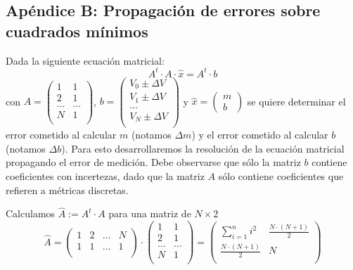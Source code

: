 \subsection{Apéndice B: Propagación de errores sobre cuadrados mínimos}
Dada la siguiente ecuación matricial:
$$ A^t \cdot A \cdot \hat{x} = A^t \cdot b $$
con
$
A = \begin{pmatrix} 
1 & 1 \\
2 & 1 \\
\dots & \dots \\
N & 1 \\
\end{pmatrix}
$, $
b = \begin{pmatrix}
V_0 \pm \Delta V\\
V_1 \pm \Delta V\\
\dots \\
V_N \pm \Delta V\\
\end{pmatrix}
$ y $
\hat{x} = \begin{pmatrix}
m \\
b
\end{pmatrix}
$ se quiere determinar el error cometido al calcular $m$ (notamos $\Delta m$) y el error cometido al calcular $b$ (notamos $\Delta b$). Para esto desarrollaremos la resolución de la ecuación matricial propagando el error de medición. Debe observarse que sólo la matriz $b$ contiene coeficientes con incertezas, dado que la matriz $A$ sólo contiene coeficientes que refieren a métricas discretas. 

Calculamos $\hat{A} := A^t \cdot  A$ para una matriz de $N \times 2$
$$ \hat{A} = 
\begin{pmatrix} 
1 & 2 & \dots & N \\
1 & 1 & \dots & 1 \\
\end{pmatrix}
\cdot
\begin{pmatrix} 
1 & 1 \\
2 & 1 \\
\dots & \dots \\
N & 1 \\
\end{pmatrix}
=
\begin{pmatrix}
\sum_{i=1}^{n}{i^2} & \frac{N \cdot (N+1)}{2} \\
\frac{N \cdot (N+1)}{2} & N \\
\end{pmatrix}
$$

